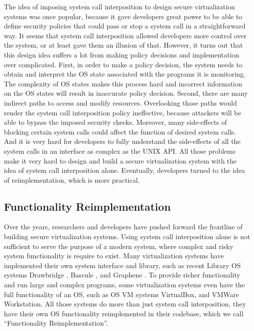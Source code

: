 The idea of imposing system call interposition to design secure virtualization systems was once popular, 
because it gave developers great power to be able to define security policies that could pass or stop a 
system call in a straightforward way. It seems that system call interposition allowed developers more control over 
the system, or at least gave them an illusion of that. However, it turns out that this design idea suffers a lot from making 
policy decisions and implementation over complicated. First, in order to make a policy decision, the system needs to 
obtain and interpret the OS state associated with the programs it is monitoring. The complexity of OS states 
makes this process hard and incorrect information on the OS states will result in inaccurate policy decision. 
Second, there are many indirect paths to access and modify resources. Overlooking those paths would render the 
system call interposition policy ineffective, because attackers will be able to bypass the imposed security checks. 
Moreover, many side-effects of blocking certain system calls could affect the function of desired system calls. And 
it is very hard for developers to fully understand the side-effects of all the system calls in an interface as complex as 
the UNIX API. All those problems make it very hard to design and build a secure virtualization system with the idea of 
system call interposition alone. Eventually, developers turned to the idea of reimplementation, which is more practical. 

\subsection {Functionality Reimplementation}
Over the years, researchers and developers have pushed forward the frontline of building secure virtualization systems. 
Using system call interposition alone is not sufficient to serve the purpose of a modern system, where complex and risky 
system functionality is require to exist. Many virtualization systems have implemented their own system interface and library, 
such as recent Library OS systems Drawbridge \cite{Drawbridge-11}, Bascule \cite{Bascule}, and Graphene \cite{Graphene-14}. 
To provide richer functionality and run large and complex programs, some virtualization systems even have the full functionality 
of an OS, such as OS VM systems VirtualBox, and VMWare Workstation. All those systems do more than just system call interposition, 
they have their own OS functionality reimplemented in their codebase, which we call ``Functionality Reimplementation''.

